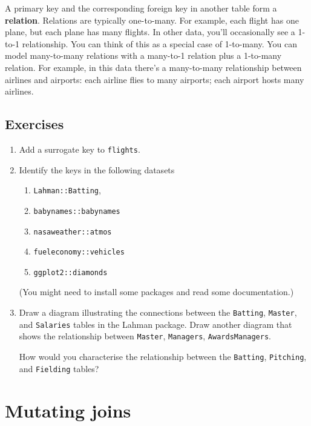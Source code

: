 \documentclass[]{book}
\providecommand{\tightlist}{%
  \setlength{\itemsep}{0pt}\setlength{\parskip}{0pt}}
\begin{document}
A primary key and the corresponding foreign key in another table form a
\textbf{relation}. Relations are typically one-to-many. For example,
each flight has one plane, but each plane has many flights. In other
data, you'll occasionally see a 1-to-1 relationship. You can think of
this as a special case of 1-to-many. You can model many-to-many
relations with a many-to-1 relation plus a 1-to-many relation. For
example, in this data there's a many-to-many relationship between
airlines and airports: each airline flies to many airports; each airport
hosts many airlines.

\subsection{Exercises}\label{exercises-27}

\begin{enumerate}
\def\labelenumi{\arabic{enumi}.}
\item
  Add a surrogate key to \texttt{flights}.
\item
  Identify the keys in the following datasets

  \begin{enumerate}
  \def\labelenumii{\arabic{enumii}.}
  \tightlist
  \item
    \texttt{Lahman::Batting},
  \item
    \texttt{babynames::babynames}
  \item
    \texttt{nasaweather::atmos}
  \item
    \texttt{fueleconomy::vehicles}
  \item
    \texttt{ggplot2::diamonds}
  \end{enumerate}

  (You might need to install some packages and read some documentation.)
\item
  Draw a diagram illustrating the connections between the
  \texttt{Batting}, \texttt{Master}, and \texttt{Salaries} tables in the
  Lahman package. Draw another diagram that shows the relationship
  between \texttt{Master}, \texttt{Managers}, \texttt{AwardsManagers}.

  How would you characterise the relationship between the
  \texttt{Batting}, \texttt{Pitching}, and \texttt{Fielding} tables?
\end{enumerate}

\section{Mutating joins}\label{mutating-joins}
\end{document}
